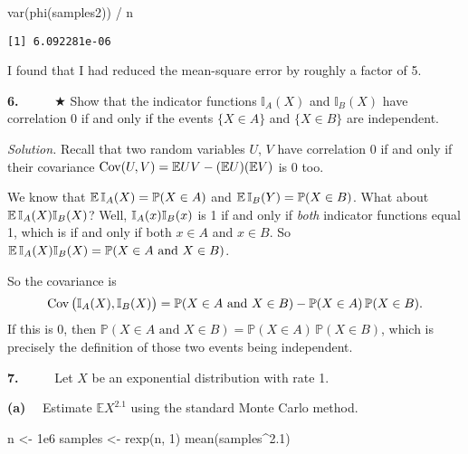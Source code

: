\documentclass[
  letterpaper,
  DIV=11,
  numbers=noendperiod]{scrreprt}
\newenvironment{Shaded}{\begin{snugshade}}{\end{snugshade}}
\newcommand{\DecValTok}[1]{\textcolor[rgb]{0.68,0.00,0.00}{#1}}
\newcommand{\FloatTok}[1]{\textcolor[rgb]{0.68,0.00,0.00}{#1}}
\newcommand{\FunctionTok}[1]{\textcolor[rgb]{0.28,0.35,0.67}{#1}}
\newcommand{\NormalTok}[1]{\textcolor[rgb]{0.00,0.23,0.31}{#1}}
\newcommand{\OtherTok}[1]{\textcolor[rgb]{0.00,0.23,0.31}{#1}}
\newcommand{\SpecialCharTok}[1]{\textcolor[rgb]{0.37,0.37,0.37}{#1}}
\theoremstyle{plain}
\theoremstyle{definition}
\theoremstyle{definition}
\theoremstyle{remark}
\begin{document}
\begin{Shaded}
\begin{Highlighting}[]
\FunctionTok{var}\NormalTok{(}\FunctionTok{phi}\NormalTok{(samples2)) }\SpecialCharTok{/}\NormalTok{ n}
\end{Highlighting}
\end{Shaded}

\begin{verbatim}
[1] 6.092281e-06
\end{verbatim}

I found that I had reduced the mean-square error by roughly a factor of
5.

\textbf{6.} ~~~~~★ Show that the indicator functions \(\mathbb I_A(X)\)
and \(\mathbb I_B(X)\) have correlation 0 if and only if the events
\(\{X \in A\}\) and \(\{X \in B\}\) are independent.

\emph{Solution.} Recall that two random variables \(U\), \(V\) have
correlation 0 if and only if their covariance
\(\operatorname{Cov}(U,V) = \mathbb{E} UV - (\mathbb{E} U)(\mathbb{E} V)\) is 0 too.

We know that \(\operatorname{\mathbb{E}}\mathbb{I}_A(X) = \mathbb P(X \in A)\) and
\(\operatorname{\mathbb{E}} \mathbb{I}_B(Y) = \mathbb P(X \in B)\). What about
\(\operatorname{\mathbb{E}} \mathbb{I}_A(X) \mathbb{I}_B(X)\)? Well, \(\mathbb{I}_A(x) \mathbb{I}_B(x)\) is 1 if and
only if \emph{both} indicator functions equal 1, which is if and only if
both \(x \in A\) and \(x \in B\). So
\(\operatorname{\mathbb{E}} \mathbb{I}_A(X) \mathbb{I}_B(X) = \mathbb P(X \in A \text{ and } X \in B)\).

So the covariance is
\[ \operatorname{Cov} \big(\mathbb{I}_A(X), \mathbb{I}_B(X) \big) = \mathbb P(X \in A \text{ and } X \in B) - \mathbb P(X \in A)\, \mathbb P(X \in B) . \]
If this is 0, then
\(\mathbb P(X \in A \text{ and } X \in B) = \mathbb P(X \in A)\, \mathbb P(X \in B)\),
which is precisely the definition of those two events being independent.

\textbf{7.} ~~~~~Let \(X\) be an exponential distribution with rate 1.

\textbf{(a)} ~~Estimate \(\mathbb EX^{2.1}\) using the standard Monte
Carlo method.

\begin{Shaded}
\begin{Highlighting}[]
\NormalTok{n }\OtherTok{\textless{}{-}} \FloatTok{1e6}
\NormalTok{samples }\OtherTok{\textless{}{-}} \FunctionTok{rexp}\NormalTok{(n, }\DecValTok{1}\NormalTok{)}
\FunctionTok{mean}\NormalTok{(samples}\SpecialCharTok{\^{}}\FloatTok{2.1}\NormalTok{)}
\end{Highlighting}
\end{Shaded}
\end{document}

